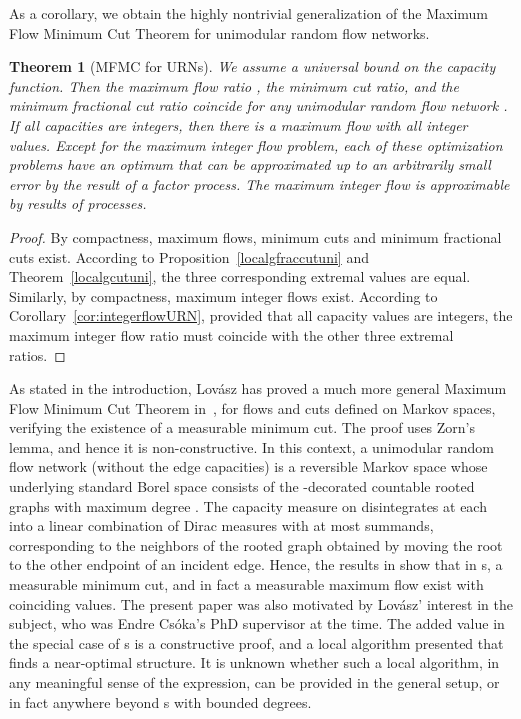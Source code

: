 \documentclass[12pt,a4paper]{article}
\newtheorem{Theorem}{Theorem}
\renewcommand{\:}{\colon}
\begin{document}
As a corollary, we obtain the highly nontrivial generalization of the Maximum Flow Minimum Cut Theorem for unimodular random flow networks. 

\begin{Theorem}[MFMC for URNs]
We assume a universal bound  on the capacity function. 
Then the maximum flow ratio , the minimum cut ratio, and the minimum fractional cut ratio coincide for any unimodular random flow network . 
If all capacities are integers, then there is a maximum flow with all integer values. 
Except for the maximum integer flow problem, each of these optimization problems have an optimum that can be approximated up to an arbitrarily small error by the result of a factor process. 
The maximum integer flow is approximable by results of  processes. 
\end{Theorem}\label{thm:MFMCuni}
\begin{proof}
By compactness, maximum flows, minimum cuts and minimum fractional cuts exist. 
According to Proposition~\ref{localgfraccutuni} and Theorem~\ref{localgcutuni}, the three corresponding extremal values are equal. 
Similarly, by compactness,  maximum integer flows exist. 
According to Corollary~\ref{cor:integerflowURN}, provided that all capacity values are integers, the maximum integer flow ratio must coincide with the other three extremal ratios. 
\end{proof}

As stated in the introduction, Lovász has proved a much more general Maximum Flow Minimum Cut Theorem in~\cite{Lovaszmeasure}, for flows and cuts defined on Markov spaces, verifying the existence of a measurable minimum cut. 
The proof uses Zorn's lemma, and hence it is non-constructive. 
In this context, a unimodular random flow network (without the edge capacities) is a reversible Markov space whose underlying standard Borel space  consists of the -decorated countable rooted graphs with maximum degree . 
The capacity measure on  disintegrates at each  into a linear combination of Dirac measures with at most  summands, corresponding to the neighbors of the rooted graph obtained by moving the root to the other endpoint of an incident edge. 
Hence, the results in \cite{Lovaszmeasure} show that in s, a measurable minimum cut, and in fact a measurable maximum flow exist with coinciding values. 
The present paper was also motivated by Lov\'asz' interest in the subject, who was Endre Cs\'oka's PhD supervisor at the time. The added value in the special case of s is a constructive proof, and a local algorithm presented that finds a near-optimal structure. 
It is unknown whether such a local algorithm, in any meaningful sense of the expression, can be provided in the general setup, or in fact anywhere beyond s with bounded degrees. 
\end{document}
